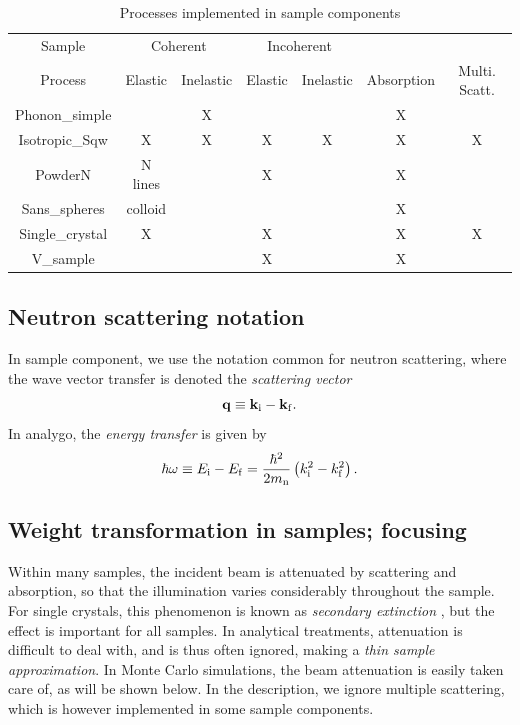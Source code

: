 \begin{table}
  \begin{center}
  {\let\my=\\
    \begin{tabular}{|c|cc|cc|c|c|}
    \hline
    Sample        & \multicolumn{2}{c|}{Coherent} & \multicolumn{2}{c|}{Incoherent} &&\\
    Process       & Elastic & Inelastic & Elastic & Inelastic & Absorption & Multi. Scatt.\\
    \hline
    Phonon\_simple&         & X         &         &           & X & \\
    Isotropic\_Sqw&  X      & X         & X       & X         & X & X \\
    PowderN       &  N lines&           & X       &           & X & \\
    Sans\_spheres &  colloid&           &         &           & X & \\
    Single\_crystal& X      &           & X       &           & X & X \\
    V\_sample     &         &           & X       &           & X & \\
    \hline
    \end{tabular}
    \caption{Processes implemented in sample components}
    \label{t:sample-process}
  }
  \end{center}
\end{table}
\subsection{Neutron scattering notation}
In sample component, we use the notation common for neutron scattering,
where the wave vector transfer is denoted the {\em scattering vector}
\begin{equation} \label{eq:q-transfer}
{\bf q} \equiv {\bf k}_{\rm i} - {\bf k}_{\rm f} .
\end{equation}
In analygo, the {\em energy transfer} is given by
\begin{equation} \label{eq:w-transfer}
\hbar \omega \equiv E_{\rm i} - E_{\rm f} =
\frac{\hbar^2}{2 m_{\rm n}} \left( k_{\rm i}^2 - k_{\rm f}^2 \right) .
\end{equation}

\subsection{Weight transformation in samples; focusing}

Within many samples,
the incident beam is attenuated by scattering and absorption,
so that the illumination varies considerably throughout the sample.
For single crystals, this phenomenon is known as
{\em secondary extinction} \cite{bacon}, but the effect is
important for all samples.
In analytical treatments, attenuation is difficult to deal with,
and is thus often ignored, making a {\em thin sample approximation}.
In Monte Carlo simulations, the beam attenuation
is easily taken care of, as will be shown below.
In the description, we ignore multiple scattering, which is however
 implemented in some sample components.

